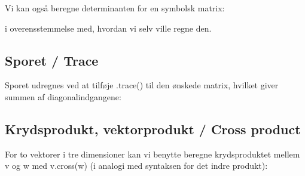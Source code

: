 \documentclass[letterpaper,10pt,english]{jupyterBook}
\begin{document}
Vi kan også beregne determinanten for en symbolsk matrix:

\begin{sphinxVerbatim}[commandchars=\\\{\}]
      

  \PYG{p}{[}\PYG{p}{[} \PYG{p}{]} \PYG{p}{[} \PYG{p}{]}\PYG{p}{]}

\end{sphinxVerbatim}

\noindent{}

\noindent{}

i overensstemmelse med, hvordan vi selv ville regne den.


\subsection{Sporet / Trace}
\label{\detokenize{notebooks/sympy/Notebook_LinAlg_2:sporet-trace}}
Sporet udregnes ved at tilføje .trace() til den ønskede matrix, hvilket giver summen af diagonalindgangene:

\begin{sphinxVerbatim}[commandchars=\\\{\}]
  \PYG{p}{[}\PYG{p}{[}  \PYG{p}{]}\PYG{p}{[}  \PYG{p}{]}\PYG{p}{[}  \PYG{p}{]}\PYG{p}{]}
\end{sphinxVerbatim}

\noindent{}

\noindent{}


\subsection{Krydsprodukt, vektorprodukt / Cross product}
\label{\detokenize{notebooks/sympy/Notebook_LinAlg_2:krydsprodukt-vektorprodukt-cross-product}}
For to vektorer i tre dimensioner kan vi benytte beregne krydsproduktet mellem v og w med v.cross(w) (i analogi med syntaksen for det indre produkt):
\end{document}
